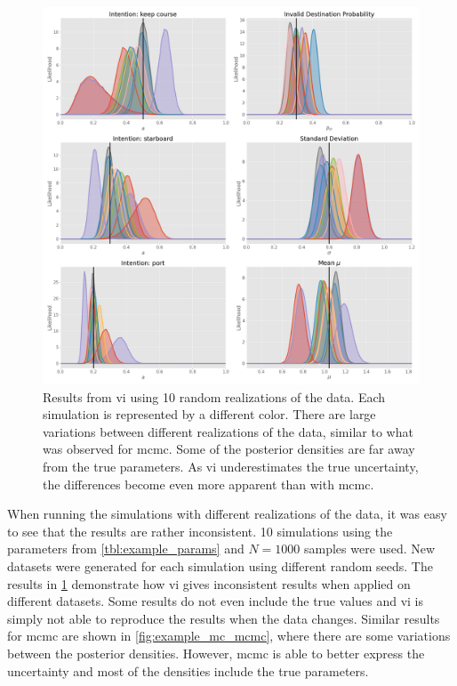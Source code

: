\begin{figure}[h]
    \centering
    \includegraphics[width=\textwidth]{figures/mc_sim_vi.png}
    \caption{Results from \acrshort{vi} using 10 random realizations of the data. Each simulation is represented by a different color. There are large variations between different realizations of the data, similar to what was observed for \acrshort{mcmc}. Some of the posterior densities are far away from the true parameters. As \acrshort{vi} underestimates the true uncertainty, the differences become even more apparent than with \acrshort{mcmc}. }
    \label{fig:example_mc_vi}
\end{figure}

When running the simulations with different realizations of the data, it was easy to see that the results are rather inconsistent. 10 simulations using the parameters from \cref{tbl:example_params} and $N=1000$ samples were used. New datasets were generated for each simulation using different random seeds. The results in \cref{fig:example_mc_vi} demonstrate how \acrshort{vi} gives inconsistent results when applied on different datasets. Some results do not even include the true values and \acrshort{vi} is simply not able to reproduce the results when the data changes. 
Similar results for \acrshort{mcmc} are shown in \cref{fig:example_mc_mcmc}, where there are some variations between the posterior densities. However, \acrshort{mcmc} is able to better express the uncertainty and most of the densities include the true parameters.


